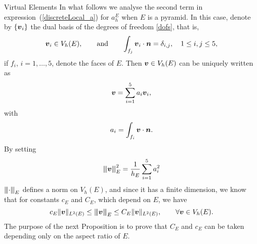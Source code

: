 \begin{chapter}{Virtual Elements}
In what follows we analyse the second term in expression~(\ref{discreteLocal_a})
for $a_h^E$ when $E$ is a pyramid.
In this case, denote by $\{\boldsymbol{v}_i\}$ the dual basis of the degrees of freedom \eqref{dofs}, that is,
\[
\boldsymbol{v}_i\in V_h(E), \qquad \mbox{and}\qquad \int_{f_j}\boldsymbol{v}_i\cdot\boldsymbol{n} =\delta_{i,j}, \quad 1\le i,j\le 5,
\]
if $f_i$, $i=1,\ldots,5$, denote the faces of $E$. Then $\boldsymbol{v}\in V_h(E)$ can be uniquely written as
\[
\boldsymbol{v}=\sum_{i=1}^5 a_i \boldsymbol{v}_i,
\]
with
\[
a_i=\int_{f_i}\boldsymbol{v}\cdot\boldsymbol{n}.
\]
By setting
\[
{\left\vert\kern-0.25ex\left\vert\kern-0.25ex\left\vert \boldsymbol{v} \right\vert\kern-0.25ex\right\vert\kern-0.25ex\right\vert}_E^2=\frac1{h_E}\sum_{i=1}^5 a_i^2
\]
${\left\vert\kern-0.25ex\left\vert\kern-0.25ex\left\vert \cdot \right\vert\kern-0.25ex\right\vert\kern-0.25ex\right\vert}_E$ defines a norm on $V_h(E)$, and since it has a finite dimension, we know that for constants $c_E$ and $C_E$, which depend on $E$, we have
\begin{equation}\label{equiv0}
c_E\|\boldsymbol{v}\|_{L^2(E)}\le {\left\vert\kern-0.25ex\left\vert\kern-0.25ex\left\vert \boldsymbol{v}\right\vert\kern-0.25ex\right\vert\kern-0.25ex\right\vert}_E\le C_E\|\boldsymbol{v}\|_{L^2(E)}, \qquad \forall \boldsymbol{v}\in V_h(E).
\end{equation}
The purpose of the next Proposition is to prove that $C_E$ and $c_E$ can be taken depending only on the aspect ratio of $E$.




\end{chapter}
